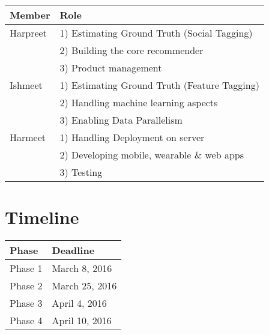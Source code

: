 \documentclass{article}
\begin{document}
\begin{tabular}{|l|l|}
  \hline
  \textbf{Member} & \textbf{Role} \\
  \hline
  Harpreet &1) Estimating Ground Truth (Social Tagging)\\
  &2) Building the core recommender\\
  &3) Product management\\

  Ishmeet &1) Estimating Ground Truth (Feature Tagging)\\
  &2) Handling machine learning aspects\\
  &3) Enabling Data Parallelism\\
  
  Harmeet &1) Handling Deployment on server\\
  &2) Developing mobile, wearable \& web apps\\
  &3) Testing\\
  \hline
\end{tabular}


\section{Timeline}


\begin{tabular}{|p{2cm}|p{6cm}|}
  \hline
  \textbf{Phase} & \textbf{Deadline} \\
  \hline
  Phase 1  & March 8, 2016 \\
  Phase 2  & March 25, 2016 \\
  Phase 3  & April 4, 2016 \\
  Phase 4  & April 10, 2016 \\
  \hline
\end{tabular}


\end{document}
